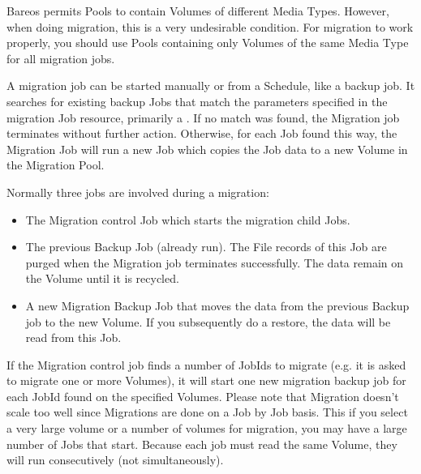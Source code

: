 Bareos permits Pools to contain Volumes of different Media Types.
However, when doing migration, this is a very undesirable condition.  For
migration to work properly, you should use Pools containing only Volumes of
the same Media Type for all migration jobs.

A migration job can be started manually or from a Schedule, like
a backup job. It searches for existing backup Jobs that match the
parameters specified in the migration Job resource, primarily a
. If no match was
found, the Migration job terminates without further action. Otherwise,
for each Job found this way, the Migration Job will run a new Job
which copies the Job data to a new Volume in the Migration Pool.

Normally three jobs are involved during a migration:

\begin{itemize}
\item The Migration control Job which starts the migration child Jobs.
\item The previous Backup Job (already run). The File records
      of this Job are purged when the Migration job terminates
      successfully. The data remain on the Volume until it is recycled.

\item A new Migration Backup Job that moves the data from the
      previous Backup job to the new Volume.  If you subsequently
      do a restore, the data will be read from this Job.
\end{itemize}

If the Migration control job finds a number of JobIds to migrate (e.g.
it is asked to migrate one or more Volumes), it will start one new
migration backup job for each JobId found on the specified Volumes.
Please note that Migration doesn't scale too well since Migrations are
done on a Job by Job basis. This if you select a very large volume or
a number of volumes for migration, you may have a large number of
Jobs that start. Because each job must read the same Volume, they will
run consecutively (not simultaneously).



